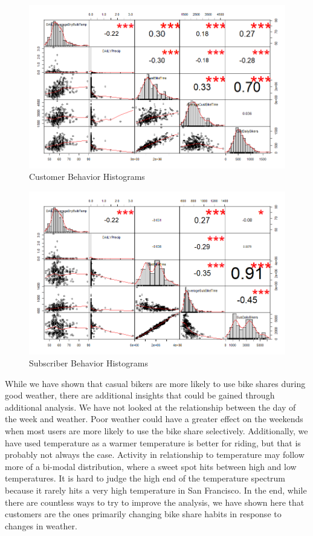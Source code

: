 \documentclass{report}
\begin{document}
\begin{figure}[h!]
	\includegraphics[width=\linewidth]{CorrCust.png}
	\caption{Customer Behavior Histograms}
	\label{fig:CustHis}
\end{figure}
\begin{figure}[h!]
	\includegraphics[width=\linewidth]{CorrSub.png}
	\caption{Subscriber Behavior Histograms}
	\label{fig:SubHis}
\end{figure}


	While we have shown that casual bikers are more likely to use bike shares during good weather, there are additional insights that could be gained through additional analysis. We have not looked at the relationship between the day of the week and weather. Poor weather could have a greater effect on the weekends when most users are more likely to use the bike share selectively. Additionally, we have used temperature as a warmer temperature is better for riding, but that is probably not always the case. Activity in relationship to temperature may follow more of a bi-modal distribution, where a sweet spot hits between high and low temperatures. It is hard to judge the high end of the temperature spectrum because it rarely hits a very high temperature in San Francisco. In the end, while there are countless ways to try to improve the analysis, we have shown here that customers are the ones primarily changing bike share habits in response to changes in weather.
\end{document}
